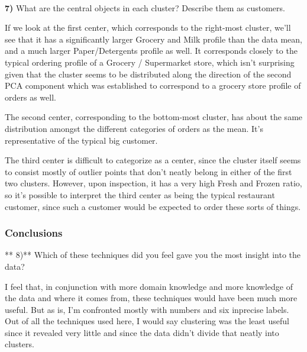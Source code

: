 \documentclass{article}
\begin{document}
    \begin{center}
    \end{center}
    { \hspace*{\fill} \\}
    
    \textbf{7)} What are the central objects in each cluster? Describe them
as customers.

    If we look at the first center, which corresponds to the right-most
cluster, we'll see that it has a significantly larger Grocery and Milk
profile than the data mean, and a much larger Paper/Detergents profile
as well. It corresponds closely to the typical ordering profile of a
Grocery / Supermarket store, which isn't surprising given that the
cluster seems to be distributed along the direction of the second PCA
component which was established to correspond to a grocery store profile
of orders as well.

The second center, corresponding to the bottom-most cluster, has about
the same distribution amongst the different categories of orders as the
mean. It's representative of the typical big customer.

The third center is difficult to categorize as a center, since the
cluster itself seems to consist mostly of outlier points that don't
neatly belong in either of the first two clusters. However, upon
inspection, it has a very high Fresh and Frozen ratio, so it's possible
to interpret the third center as being the typical restaurant customer,
since such a customer would be expected to order these sorts of things.

    \subsubsection{Conclusions}\label{conclusions}

** 8)** Which of these techniques did you feel gave you the most insight
into the data?

    I feel that, in conjunction with more domain knowledge and more
knowledge of the data and where it comes from, these techniques would
have been much more useful. But as is, I'm confronted mostly with
numbers and six inprecise labels. Out of all the techniques used here, I
would say clustering was the least useful since it revealed very little
and since the data didn't divide that neatly into clusters.
\end{document}
